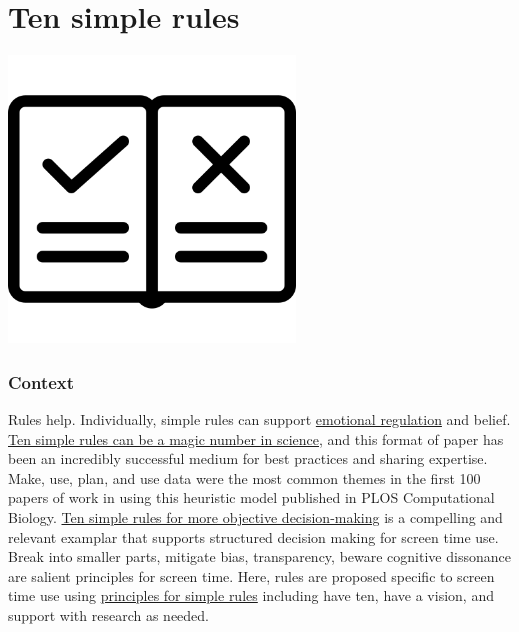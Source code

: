\documentclass[
]{book}
\begin{document}
\hypertarget{rules}{%
\chapter{Ten simple rules}\label{rules}}

\includegraphics[width=3in,height=\textheight]{./rules.png}

\hypertarget{context-1}{%
\subsection*{Context}\label{context-1}}

Rules help. Individually, simple rules can support \href{https://psycnet.apa.org/doiLanding?doi=10.1037\%2Fcap0000142}{emotional regulation} and belief. \href{https://journals.plos.org/ploscompbiol/article?id=10.1371/journal.pcbi.1006670}{Ten simple rules can be a magic number in science}, and this format of paper has been an incredibly successful medium for best practices and sharing expertise. Make, use, plan, and use data were the most common themes in the first 100 papers of work in using this heuristic model published in PLOS Computational Biology. \href{https://journals.plos.org/ploscompbiol/article?id=10.1371/journal.pcbi.1007706}{Ten simple rules for more objective decision-making} is a compelling and relevant examplar that supports structured decision making for screen time use. Break into smaller parts, mitigate bias, transparency, beware cognitive dissonance are salient principles for screen time. Here, rules are proposed specific to screen time use using \href{https://journals.plos.org/ploscompbiol/article?id=10.1371/journal.pcbi.1003858}{principles for simple rules} including have ten, have a vision, and support with research as needed.
\end{document}
